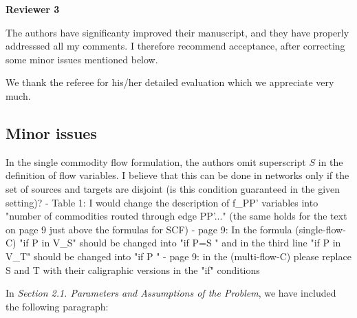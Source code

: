 \documentclass{article}
\newenvironment{reviewer}{\setcounter{pointcounter}{1}}{}
\newcommand{\point}{\text{{\selectfont \thepointcounter} \stepcounter{pointcounter}}}
\begin{document}
	\newpage
	\begin{reviewer}
		
		\begin{tcolorbox}[breakable,enhanced,coltitle=black,colback=green!75!black,colframe=green!75!black,borderline={1pt}{0pt}{black},boxrule=0pt]
			\textbf{Reviewer 3}
		\end{tcolorbox}
		
		\begin{itshape}
			The authors have significanty improved their manuscript, and they have properly addresssed all my comments.
			I therefore recommend acceptance, after correcting some minor issues mentioned below.

		\end{itshape}
		
		\begin{tcolorbox}[breakable,enhanced,coltitle=black,colback=green!5!white,colframe=green!75!black,title=\textbf{Answer R2.\point},borderline={1pt}{0pt}{black},boxrule=0pt]
		We thank the referee for his/her detailed evaluation which we appreciate very much.
			
		\end{tcolorbox}
		
		\subsection*{Minor issues}
				
		\begin{itshape}
			In the single commodity flow formulation, the authors omit superscript $S$ in the definition of flow variables.
I believe that this can be done in networks only if the set of sources and targets are disjoint (is this condition guaranteed in the given setting)?
- Table 1: I would change the description of f_PP' variables into "number of commodities routed through edge PP'..." (the same holds for the text on page 9 just above the formulas for SCF)
- page 9: In the formula (single-flow-C) "if P in V_S" should be changed into "if P=S \in {}" and in the third line "if P in V_T" should be changed into "if P \in {}"
- page 9: in the (multi-flow-C) please replace S and T with their caligraphic versions in the "if" conditions
		\end{itshape}
		
		\begin{tcolorbox}[breakable,enhanced,coltitle=black,colback=green!5!white,colframe=green!75!black,title=\textbf{Answer R2.\point},borderline={1pt}{0pt}{black},boxrule=0pt]
			In \textit{Section 2.1. Parameters and Assumptions of the Problem}, we have included the following paragraph: 


\end{tcolorbox}
\end{reviewer}
\end{document}
